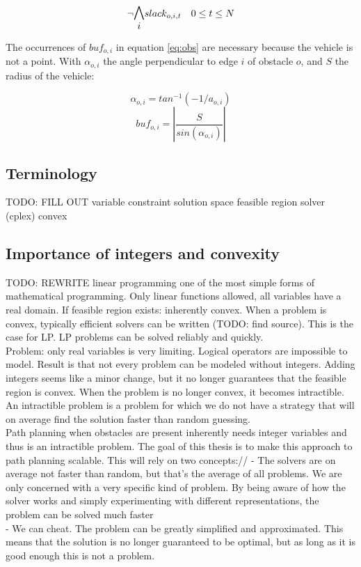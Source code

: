\begin{equation}
\neg \mathlarger{\mathlarger{\bigwedge_{i}}} slack_{o,i,t} \quad 0 \leq t \leq N
\end{equation}

The occurrences of $buf_{o,i}$ in equation \ref{eq:obs} are necessary because the vehicle is not a point. With $\alpha_{o,i}$ the angle perpendicular to edge $i$ of obstacle $o$, and $S$ the radius of the vehicle:

\begin{equation}
\alpha_{o,i} = tan^{-1}( -1 / a_{o,i})
\end{equation}
\begin{equation}
buf_{o,i} = |\dfrac{S}{sin(\alpha_{o,i})}|
\end{equation}



\subsection{Terminology}
TODO: FILL OUT
variable
constraint
solution space
feasible region
solver (cplex)
convex

\subsection{Importance of integers and convexity}
TODO: REWRITE
linear programming one of the most simple forms of mathematical programming. Only linear functions allowed, all variables have a real domain. If feasible region exists: inherently convex. When a problem is convex, typically efficient solvers can be written (TODO: find source). This is the case for LP. LP problems can be solved reliably and quickly.
\\
Problem: only real variables is very limiting. Logical operators are impossible to model. Result is that not every problem can be modeled without integers. Adding integers seems like a minor change, but it no longer guarantees that the feasible region is convex. When the problem is no longer convex, it becomes intractible. An intractible problem is a problem for which we do not have a strategy that will on average find the solution faster than random guessing.
\\
Path planning when obstacles are present inherently needs integer variables and thus is an intractible problem. The goal of this thesis is to make this approach to path planning scalable. This will rely on two concepts://
- The solvers are on average not faster than random, but that's the average of all problems. We are only concerned with a very specific kind of problem. By being aware of how the solver works and simply experimenting with different representations, the problem can be solved much faster\\
- We can cheat. The problem can be greatly simplified and approximated. This means that the solution is no longer guaranteed to be optimal, but as long as it is good enough this is not a problem.\\

